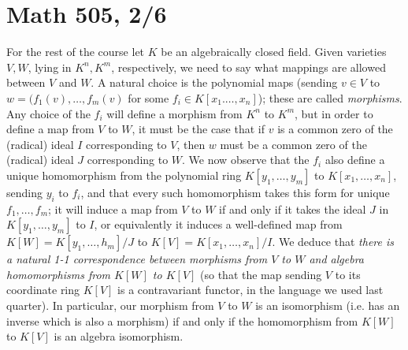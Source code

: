 \documentclass[10pt]{article}
\begin{document}
\section*{Math 505, 2/6}

For the rest of the course let $K$ be an algebraically closed field.
Given varieties $V,W$, lying in $K^n,K^m$, respectively, we need to say
what mappings are allowed between $V$ and $W$. A natural choice is the
polynomial maps (sending $v\in V$ to $w=(f_1(v),\ldots,f_m(v)$ for some
$f_i\in K[x_1.\ldots,x_n]$); these are called {\sl morphisms}. Any
choice of the $f_i$ will define a morphism from $K^n$ to $K^m$, but in
order to define a map from $V$ to $W$, it must be the case that if $v$
is a common zero of the (radical) ideal $I$ corresponding to $V$, then
$w$ must be a common zero of the (radical) ideal $J$ corresponding to
$W$. We now observe that the $f_i$ also define a unique homomorphism
from the polynomial ring $K[y_1,\ldots,y_m]$ to $K[x_1,\ldots,x_n]$,
sending $y_i$ to $f_i$, and that every such homomorphism takes this form
for unique $f_1,\ldots,f_m$; it will induce a map from $V$ to $W$ if and
only if it takes the ideal $J$ in $K[y_1,\ldots,y_m]$ to $I$, or
equivalently it induces a well-defined map from $K[W] =
K[y_1,\ldots,h_m]/J$ to $K[V] = K[x_1,\ldots,x_n]/I$. We deduce that
{\sl there is a natural 1-1 correspondence between morphisms from $V$ to
  $W$ and algebra homomorphisms from $K[W]$ to $K[V]$} (so that the map
sending $V$ to its coordinate ring $K[V]$ is a contravariant functor, in
the language we used last quarter). In particular, our morphism from $V$
to $W$ is an isomorphism (i.e. has an inverse which is also a morphism)
if and only if the homomorphism from $K[W]$ to $K[V]$ is an algebra
isomorphism.
\end{document}
